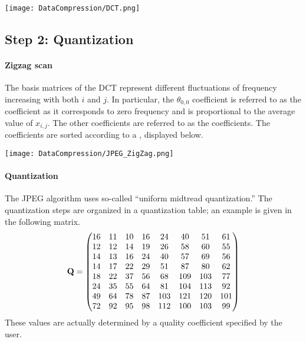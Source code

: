 \documentclass[a4paper, 11pt, openany]{book}
\begin{document}
\begin{center}
\texttt{[image: DataCompression/DCT.png]}
\end{center}




\subsection{Step 2: Quantization}

\paragraph{Zigzag scan}

The basis matrices of the DCT represent different fluctuations of frequency increasing with both $i$ and $j$. In particular, the $\theta_{0,0}$ coefficient is referred to as the  coefficient as it corresponds to zero frequency and is proportional to the average value of $x_{i,j}$. The other coefficients are referred to as the  coefficients.  The coefficients are sorted according to a , displayed below.

\begin{center}
\texttt{[image: DataCompression/JPEG\_ZigZag.png]}
\end{center}


\paragraph{Quantization}
The JPEG algorithm uses so-called ``uniform midtread quantization.'' The quantization steps are organized in a quantization table; an example is given in the following matrix.
\[
    {\bf Q} = \begin{pmatrix}
    16 & 11 & 10 & 16 & 24 & 40 & 51 & 61\\
    12 & 12 & 14 & 19 & 26 & 58 & 60 & 55\\
    14 & 13 & 16 & 24 & 40 & 57 & 69 & 56\\
    14 & 17 & 22 & 29 & 51 & 87 & 80 & 62\\
    18 & 22 & 37 & 56 & 68 & 109 & 103 & 77\\
    24 & 35 & 55 & 64 & 81 & 104 & 113 & 92\\
    49 & 64 & 78 & 87 & 103 & 121 & 120 & 101\\
    72 & 92 & 95 & 98 & 112 & 100 & 103 & 99
    \end{pmatrix}
\]
These values are actually determined by a quality coefficient specified by the user.
\end{document}
